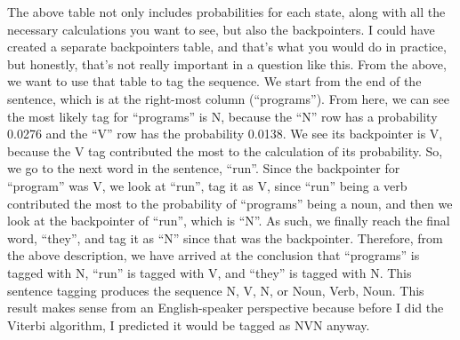 \begin{solution}
The above table not only includes probabilities for each state, along with all the necessary calculations you want to see, but also the backpointers. I could have created a separate backpointers table, and that's what you would do in practice, but honestly, that's not really important in a question like this. From the above, we want to use that table to tag the sequence. We start from the end of the sentence, which is at the right-most column (``programs''). From here, we can see the most likely tag for ``programs'' is N, because the ``N'' row has a probability 0.0276 and the ``V'' row has the probability 0.0138. We see its backpointer is V, because the V tag contributed the most to the calculation of its probability. So, we go to the next word in the sentence, ``run''. Since the backpointer for ``program'' was V, we look at ``run'', tag it as V, since ``run'' being a verb contributed the most to the probability of ``programs'' being a noun, and then we look at the backpointer of ``run'', which is ``N''. As such, we finally reach the final word, ``they'', and tag it as ``N'' since that was the backpointer. Therefore, from the above description, we have arrived at the conclusion that ``programs'' is tagged with N, ``run'' is tagged with V, and ``they'' is tagged with N. This sentence tagging produces the sequence N, V, N, or Noun, Verb, Noun. This result makes sense from an English-speaker perspective because before I did the Viterbi algorithm, I predicted it would be tagged as NVN anyway.
\end{solution}